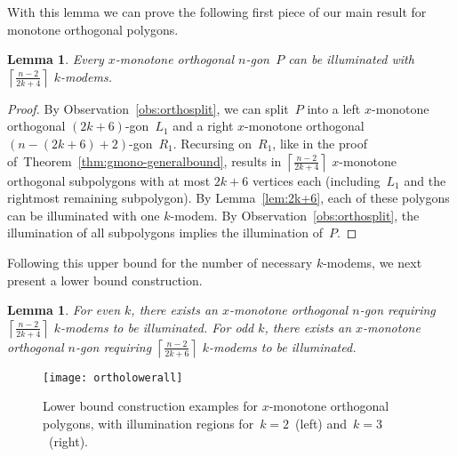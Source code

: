 \documentclass[A4]{article}
\newtheorem{lemma}[theorem]{Lemma}
\begin{document}
With this lemma we can prove the following first piece of our main result for monotone orthogonal polygons.

\begin{lemma}\label{lem:orthoupperall}
  Every $x$-monotone orthogonal $n$-gon~$P$ can be illuminated with $\left\lceil \frac{n-2}{2k+4}\right\rceil$ \mbox{$k$-modems}.
\end{lemma}
\begin{proof}
  By Observation~\ref{obs:orthosplit}, we can split~$P$ into a left $x$-monotone orthogonal $(2k\!+\!6)$-gon~$L_1$ and a right $x$-monotone orthogonal $(n\!-\!(2k\!+\!6)\!+\!2)$-gon~$R_1$.
  Recursing on~$R_1$, like in the proof of~Theorem~\ref{thm:gmono-generalbound}, results in $\left\lceil \frac{n-2}{2k+4}\right\rceil$ $x$-monotone orthogonal subpolygons with at most $2k\!+\!6$ vertices each (including~$L_1$ and the rightmost remaining subpolygon).
By Lemma~\ref{lem:2k+6}, each of these polygons can be illuminated with one \mbox{$k$-modem}.
By Observation~\ref{obs:orthosplit}, the illumination of all subpolygons implies the illumination of~$P$. \end{proof}

Following this upper bound for the number of necessary \mbox{$k$-modems}, we next present a lower bound construction.

\begin{lemma}\label{lem:ortholowerall}
  For even $k$, there exists an $x$-monotone orthogonal $n$-gon requiring $\left\lceil \frac{n-2}{2k+4}\right\rceil$ \mbox{$k$-modems} to be illuminated.
For odd $k$, there exists an $x$-monotone orthogonal $n$-gon requiring $\left\lceil \frac{n-2}{2k+6}\right\rceil$ \mbox{$k$-modems} to be illuminated.
\end{lemma}


\begin{figure}[htb]
  \centering
  \texttt{[image: ortholowerall]}
  \caption{Lower bound construction examples for $x$-monotone orthogonal polygons, with illumination regions for~$k=2$~(left) and~$k=3$~(right).
  }
 \label{fig:ortholowerall}
\end{figure}
\end{document}
